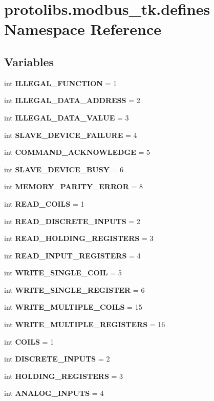 \section{protolibs.\+modbus\+\_\+tk.\+defines Namespace Reference}
\label{namespaceprotolibs_1_1modbus__tk_1_1defines}
\subsection*{Variables}
\begin{DoxyCompactItemize}
\item 
int {\bf I\+L\+L\+E\+G\+A\+L\+\_\+\+F\+U\+N\+C\+T\+I\+O\+N} = 1
\item 
int {\bf I\+L\+L\+E\+G\+A\+L\+\_\+\+D\+A\+T\+A\+\_\+\+A\+D\+D\+R\+E\+S\+S} = 2
\item 
int {\bf I\+L\+L\+E\+G\+A\+L\+\_\+\+D\+A\+T\+A\+\_\+\+V\+A\+L\+U\+E} = 3
\item 
int {\bf S\+L\+A\+V\+E\+\_\+\+D\+E\+V\+I\+C\+E\+\_\+\+F\+A\+I\+L\+U\+R\+E} = 4
\item 
int {\bf C\+O\+M\+M\+A\+N\+D\+\_\+\+A\+C\+K\+N\+O\+W\+L\+E\+D\+G\+E} = 5
\item 
int {\bf S\+L\+A\+V\+E\+\_\+\+D\+E\+V\+I\+C\+E\+\_\+\+B\+U\+S\+Y} = 6
\item 
int {\bf M\+E\+M\+O\+R\+Y\+\_\+\+P\+A\+R\+I\+T\+Y\+\_\+\+E\+R\+R\+O\+R} = 8
\item 
int {\bf R\+E\+A\+D\+\_\+\+C\+O\+I\+L\+S} = 1
\item 
int {\bf R\+E\+A\+D\+\_\+\+D\+I\+S\+C\+R\+E\+T\+E\+\_\+\+I\+N\+P\+U\+T\+S} = 2
\item 
int {\bf R\+E\+A\+D\+\_\+\+H\+O\+L\+D\+I\+N\+G\+\_\+\+R\+E\+G\+I\+S\+T\+E\+R\+S} = 3
\item 
int {\bf R\+E\+A\+D\+\_\+\+I\+N\+P\+U\+T\+\_\+\+R\+E\+G\+I\+S\+T\+E\+R\+S} = 4
\item 
int {\bf W\+R\+I\+T\+E\+\_\+\+S\+I\+N\+G\+L\+E\+\_\+\+C\+O\+I\+L} = 5
\item 
int {\bf W\+R\+I\+T\+E\+\_\+\+S\+I\+N\+G\+L\+E\+\_\+\+R\+E\+G\+I\+S\+T\+E\+R} = 6
\item 
int {\bf W\+R\+I\+T\+E\+\_\+\+M\+U\+L\+T\+I\+P\+L\+E\+\_\+\+C\+O\+I\+L\+S} = 15
\item 
int {\bf W\+R\+I\+T\+E\+\_\+\+M\+U\+L\+T\+I\+P\+L\+E\+\_\+\+R\+E\+G\+I\+S\+T\+E\+R\+S} = 16
\item 
int {\bf C\+O\+I\+L\+S} = 1
\item 
int {\bf D\+I\+S\+C\+R\+E\+T\+E\+\_\+\+I\+N\+P\+U\+T\+S} = 2
\item 
int {\bf H\+O\+L\+D\+I\+N\+G\+\_\+\+R\+E\+G\+I\+S\+T\+E\+R\+S} = 3
\item 
int {\bf A\+N\+A\+L\+O\+G\+\_\+\+I\+N\+P\+U\+T\+S} = 4
\end{DoxyCompactItemize}



